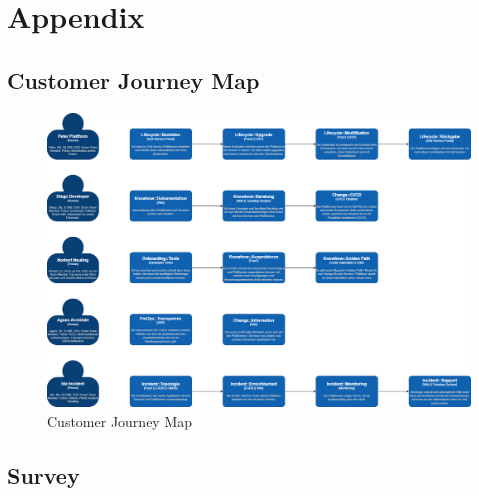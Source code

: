 \documentclass[a4paper,12pt]{article}
\begin{document}
    \section{Appendix}
    \label{sec:appendix}

    \subsection{Customer Journey Map}
    \label{subsec:cusjourmap}
    \begin{figure}
        \includegraphics[angle=270,origin=c,width=\linewidth]{customer-journey.png}
        \caption{Customer Journey Map}
        \label{fig:customerjourney}
    \end{figure}

    \subsection{Survey}
    \label{subsec:survey}
\end{document}
